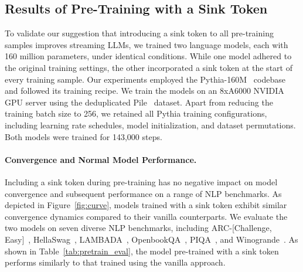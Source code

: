 \subsection{Results of Pre-Training with a Sink Token} To validate our suggestion that introducing a sink token to all pre-training samples improves streaming LLMs, we trained two language models, each with 160 million parameters, under identical conditions. While one model adhered to the original training settings, the other incorporated a sink token at the start of every training sample. Our experiments employed the Pythia-160M~\citep{biderman2023pythia} codebase and followed its training recipe. We train the models on an 8xA6000 NVIDIA GPU server using the deduplicated Pile~\citep{pile} dataset. Apart from reducing the training batch size to 256, we retained all Pythia training configurations, including learning rate schedules, model initialization, and dataset permutations. Both models were trained for 143,000 steps.

\begin{minipage}[t]{\textwidth}
    \begin{minipage}[t]{0.3\textwidth}
    \centering

    \label{fig:curve}
  \end{minipage}
  \hfill
  \begin{minipage}[t]{0.66\textwidth}
    \centering
    \small

    \label{tab:pretrain_eval}

    \end{minipage}

  \end{minipage}

\paragraph{Convergence and Normal Model Performance.} Including a sink token during pre-training has no negative impact on model convergence and subsequent performance on a range of NLP benchmarks. As depicted in Figure~\ref{fig:curve}, models trained with a sink token exhibit similar convergence dynamics compared to their vanilla counterparts. We evaluate the two models on seven diverse NLP benchmarks, including ARC-[Challenge, Easy]~\citep{arc}, HellaSwag~\citep{hellaswag}, LAMBADA~\citep{paperno-etal-2016-lambada}, OpenbookQA~\citep{OpenBookQA2018}, PIQA~\citep{piqa}, and Winogrande~\citep{sakaguchi2019winogrande}. As shown in Table~\ref{tab:pretrain_eval}, the model pre-trained with a sink token performs similarly to that trained using the vanilla approach.

